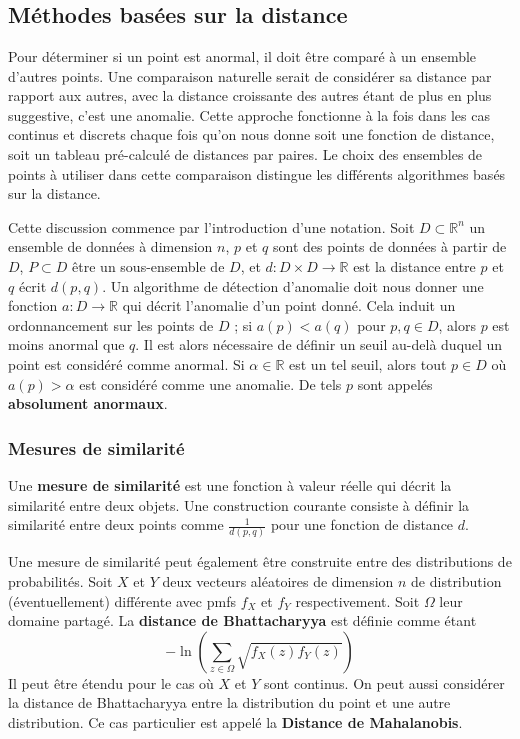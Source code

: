 \section{}\label{Section:2}
\subsection{Méthodes bas\'ees sur la distance}

Pour déterminer si un point est anormal, il doit être comparé à un ensemble d'autres points. 
Une comparaison naturelle serait de considérer sa distance par rapport aux autres,
avec la distance croissante des autres étant de plus en plus suggestive, c'est une anomalie.
Cette approche fonctionne à la fois dans les cas continus et discrets chaque fois qu'on nous donne soit une fonction de distance, soit un tableau pré-calculé de distances par paires.
Le choix des ensembles de points à utiliser dans cette comparaison distingue les différents algorithmes basés sur la distance.

Cette discussion commence par l'introduction d'une notation.
Soit $D \subset \mathbb{R}^n$ un ensemble de données à dimension $n$, 
$p$ et $q$ sont des points de données à partir de $D$, 
$P \subset D$ être un sous-ensemble de $D$, 
et $d : D \times D \to \mathbb{R}$ est la distance entre $p$ et $q$ écrit $d(p,q)$.
Un algorithme de détection d'anomalie doit nous donner une fonction $a : D \to \mathbb{R}$ qui décrit l'anomalie d'un point donné.
Cela induit un ordonnancement sur les points de $D$ ;
si $a(p) < a(q)$ pour $p,q \in D$, alors $p$ est moins anormal que $q$.
Il est alors nécessaire de définir un seuil au-delà duquel un point est considéré comme anormal.
Si $\alpha \in \mathbb{R}$ est un tel seuil, alors tout $p \in D$ où $a(p) > \alpha$ est considéré comme une anomalie.
De tels $p$ sont appelés \textbf{absolument anormaux}.

\subsubsection*{Mesures de similarité}

Une \textbf{mesure de similarité} est une fonction à valeur réelle qui décrit la similarité entre deux objets.
Une construction courante consiste à définir la similarité entre deux points comme $\frac{1}{d(p,q)}$ pour une fonction de distance $d$.

Une mesure de similarité peut également être construite entre des distributions de probabilités.
Soit $X$ et $Y$ deux vecteurs aléatoires de dimension $n$ de distribution (éventuellement) différente avec pmfs $f_X$ et $f_Y$ respectivement.
Soit $\Omega$ leur domaine partagé.
La \textbf{distance de Bhattacharyya } est définie comme étant 
\[
-\ln\left( \sum_{z \in \Omega} \sqrt{f_X(z) f_Y(z)} \right)
\]
Il peut être étendu pour le cas où $X$ et $Y$ sont continus. On peut aussi considérer la distance de Bhattacharyya entre la distribution du point et une autre distribution.
Ce cas particulier est appelé la \textbf{Distance de Mahalanobis}.

